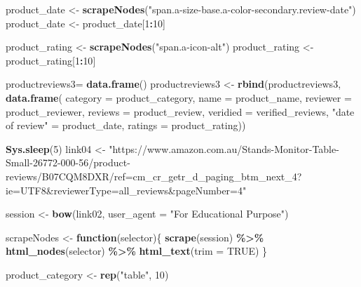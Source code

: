 \documentclass[
]{article}
\newenvironment{Shaded}{\begin{snugshade}}{\end{snugshade}}
\newcommand{\AttributeTok}[1]{\textcolor[rgb]{0.13,0.29,0.53}{#1}}
\newcommand{\ConstantTok}[1]{\textcolor[rgb]{0.56,0.35,0.01}{#1}}
\newcommand{\ControlFlowTok}[1]{\textcolor[rgb]{0.13,0.29,0.53}{\textbf{#1}}}
\newcommand{\DecValTok}[1]{\textcolor[rgb]{0.00,0.00,0.81}{#1}}
\newcommand{\FunctionTok}[1]{\textcolor[rgb]{0.13,0.29,0.53}{\textbf{#1}}}
\newcommand{\NormalTok}[1]{#1}
\newcommand{\OtherTok}[1]{\textcolor[rgb]{0.56,0.35,0.01}{#1}}
\newcommand{\SpecialCharTok}[1]{\textcolor[rgb]{0.81,0.36,0.00}{\textbf{#1}}}
\newcommand{\StringTok}[1]{\textcolor[rgb]{0.31,0.60,0.02}{#1}}
\begin{document}
\begin{Shaded}
\begin{Highlighting}[]
\NormalTok{  product\_date }\OtherTok{\textless{}{-}} \FunctionTok{scrapeNodes}\NormalTok{(}\StringTok{"span.a{-}size{-}base.a{-}color{-}secondary.review{-}date"}\NormalTok{)}
\NormalTok{  product\_date }\OtherTok{\textless{}{-}}\NormalTok{ product\_date[}\DecValTok{1}\SpecialCharTok{:}\DecValTok{10}\NormalTok{]}
  
\NormalTok{  product\_rating }\OtherTok{\textless{}{-}} \FunctionTok{scrapeNodes}\NormalTok{(}\StringTok{"span.a{-}icon{-}alt"}\NormalTok{)}
\NormalTok{  product\_rating }\OtherTok{\textless{}{-}}\NormalTok{ product\_rating[}\DecValTok{1}\SpecialCharTok{:}\DecValTok{10}\NormalTok{]}
  
\NormalTok{  productreviews3}\OtherTok{=} \FunctionTok{data.frame}\NormalTok{()}
\NormalTok{  productreviews3 }\OtherTok{\textless{}{-}} \FunctionTok{rbind}\NormalTok{(productreviews3, }\FunctionTok{data.frame}\NormalTok{(}
                      \AttributeTok{category =}\NormalTok{ product\_category,}
                      \AttributeTok{name =}\NormalTok{ product\_name,}
                      \AttributeTok{reviewer =}\NormalTok{ product\_reviewer,}
                      \AttributeTok{reviews =}\NormalTok{ product\_review,}
                      \AttributeTok{veridied =}\NormalTok{ verified\_reviews,}
                      \StringTok{"date of review"} \OtherTok{=}\NormalTok{ product\_date,}
                      \AttributeTok{ratings =}\NormalTok{ product\_rating))}
  
   \FunctionTok{Sys.sleep}\NormalTok{(}\DecValTok{5}\NormalTok{)}
\NormalTok{link04 }\OtherTok{\textless{}{-}} \StringTok{"https://www.amazon.com.au/Stands{-}Monitor{-}Table{-}Small{-}26772{-}000{-}56/product{-}reviews/B07CQM8DXR/ref=cm\_cr\_getr\_d\_paging\_btm\_next\_4?ie=UTF8\&reviewerType=all\_reviews\&pageNumber=4"}


\NormalTok{  session }\OtherTok{\textless{}{-}} \FunctionTok{bow}\NormalTok{(link02,}
               \AttributeTok{user\_agent =} \StringTok{"For Educational Purpose"}\NormalTok{)}

\NormalTok{  scrapeNodes }\OtherTok{\textless{}{-}} \ControlFlowTok{function}\NormalTok{(selector)\{}
    \FunctionTok{scrape}\NormalTok{(session) }\SpecialCharTok{\%\textgreater{}\%}
      \FunctionTok{html\_nodes}\NormalTok{(selector) }\SpecialCharTok{\%\textgreater{}\%}
      \FunctionTok{html\_text}\NormalTok{(}\AttributeTok{trim =} \ConstantTok{TRUE}\NormalTok{)}
\NormalTok{  \}}

\NormalTok{  product\_category }\OtherTok{\textless{}{-}} \FunctionTok{rep}\NormalTok{(}\StringTok{"table"}\NormalTok{, }\DecValTok{10}\NormalTok{)}


\end{Highlighting}
\end{Shaded}
\end{document}
